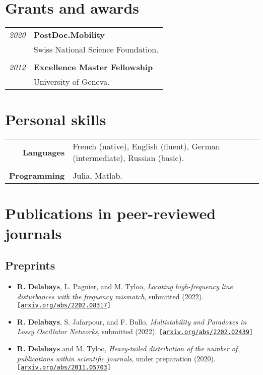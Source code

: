 \documentclass[10pt]{article}
\begin{document}
\section*{Grants and awards}
\begin{tabular}{rl}
 \textit{2020} & \textbf{PostDoc.Mobility}\\
 & Swiss National Science Foundation.\\
 &\\
 \textit{2012} & \textbf{Excellence Master Fellowship}\\
 & University of Geneva.
\end{tabular}


\section*{Personal skills}
\begin{tabular}{rl}
 {\bf Languages} & French (native), English (fluent), German (intermediate), Russian (basic). \\
 &\\
 {\bf Programming} & Julia, Matlab.
\end{tabular}


\newpage

\section*{Publications in peer-reviewed journals}
\subsection*{Preprints}

\begin{itemize}
 \item \textcolor{hei}{\bf R. Delabays}, L. Pagnier, and M. Tyloo,
 \textit{ Locating high-frequency line disturbances with the frequency mismatch},
 submitted (2022).
 {\footnotesize \tt [\url{arxiv.org/abs/2202.08317}]}
 
 \item \textcolor{hei}{\bf R. Delabays}, S. Jafarpour, and F. Bullo,
 \textit{Multistability and Paradoxes in Lossy Oscillator Networks},
 submitted (2022).
 {\footnotesize \tt [\url{arxiv.org/abs/2202.02439}]}
 
 \item \textcolor{hei}{\bf R. Delabays} and M. Tyloo,
 \textit{Heavy-tailed distribution of the number of publications within scientific journals},
 under preparation (2020).
 {\footnotesize \tt [\url{arxiv.org/abs/2011.05703}]} 
\end{itemize}
\end{document}
